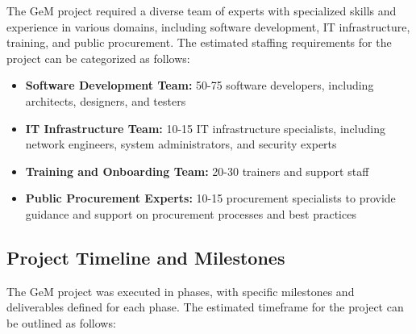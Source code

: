 The GeM project required a diverse team of experts with specialized skills and experience in various domains, including software development, IT infrastructure, training, and public procurement. The estimated staffing requirements for the project can be categorized as follows:

\begin{itemize}
    \item \textbf{Software Development Team:} 50-75 software developers, including architects, designers, and testers
    
    \item \textbf{IT Infrastructure Team:} 10-15 IT infrastructure specialists, including network engineers, system administrators, and security experts
    
    \item \textbf{Training and Onboarding Team:} 20-30 trainers and support staff
    
    \item \textbf{Public Procurement Experts:} 10-15 procurement specialists to provide guidance and support on procurement processes and best practices
\end{itemize}

\subsection{Project Timeline and Milestones}

The GeM project was executed in phases, with specific milestones and deliverables defined for each phase. The estimated timeframe for the project can be outlined as follows:


